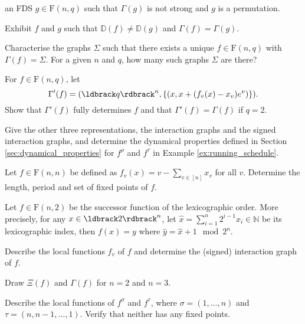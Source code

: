\documentclass[a4paper, 11pt]{book}
\numberwithin{equation}{section}
\theoremstyle{plain}
\newcommand{\graph}{\Xi}
\newcommand{\AGraph}{\Gamma}
\newcommand{\IG}{\mathbb{D}}
\newcommand{\functions}{\mathrm{F}}
\renewcommand{\(}{\ldbrack}
\renewcommand{\)}{\rdbrack}
\newcommand{\N}{\mathbb{N}}
\begin{document}
\begin{exercises}
\begin{exercises}
	\item an FDS $g \in \functions(n,q)$ such that $\AGraph(g)$ is not strong and $g$ is a permutation.
\end{exercises}



\item Exhibit $f$ and $g$ such that $\IG(f) \ne \IG(g)$ and $\AGraph(f) = \AGraph(g)$.

\item Characterise the graphs $\Sigma$ such that there exists a unique $f \in \functions(n,q)$ with $\AGraph(f) = \Sigma$. For a given $n$ and $q$, how many such graphs $\Sigma$ are there?

\item For $f \in \functions(n,q)$, let
\[
	\AGraph'(f) = (\(q\)^n, \{ (x, x + (f_v(x) - x_v) e^v) \}).
\]
Show that $\AGraph'(f)$ fully determines $f$ and that $\AGraph'(f) = \AGraph(f)$ if $q=2$.






\item Give the other three representations, the interaction graphs and the signed interaction graphs, and determine the dynamical properties defined in Section \ref{sec:dynamical_properties} for $f^\rho$ and $f^\tau$ in Example \ref{ex:running_schedule}.




\item Let $f \in \functions(n,n)$ be defined as $f_v(x) = v - \sum_{v \in [n]} x_v$ for all $v$. Determine the length, period and set of fixed points of $f$.



\item \label{exerc:successor_lexicographic} Let $f \in \functions(n,2)$ be the successor function of the lexicographic order. More precisely, for any $x \in \(2\)^n$, let $\hat{x} = \sum_{i=1}^n 2^{i-1} x_i \in \N$ be its lexicographic index, then $f(x) = y$ where $\hat{y} = \hat{x} + 1 \mod 2^n$.
\begin{exercises}
	\item Describe the local functions $f_v$ of $f$ and determine the (signed) interaction graph of $f$.
	
	\item Draw $\graph(f)$ and $\AGraph(f)$ for $n = 2$ and $n=3$.
	
	\item Describe the local functions of $f^\sigma$ and $f^\tau$, where $\sigma = (1, \dots, n)$ and $\tau = (n, n-1, \dots, 1)$. Verify that neither has any fixed points.
	

\end{exercises}
\end{exercises}
\end{document}
